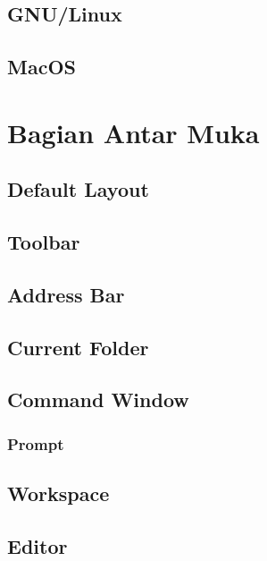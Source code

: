 \documentclass[12pt]{book}
\begin{document}
	\subsection{GNU/Linux}
	\subsection{MacOS}
	
	\section{Bagian Antar Muka}
	\subsection{Default Layout}
	\subsection{Toolbar}
	\subsection{Address Bar}
	\subsection{Current Folder}
	\subsection{Command Window}
	\subsubsection{Prompt}
	\subsection{Workspace}
	\subsection{Editor}
	
	
\end{document}
